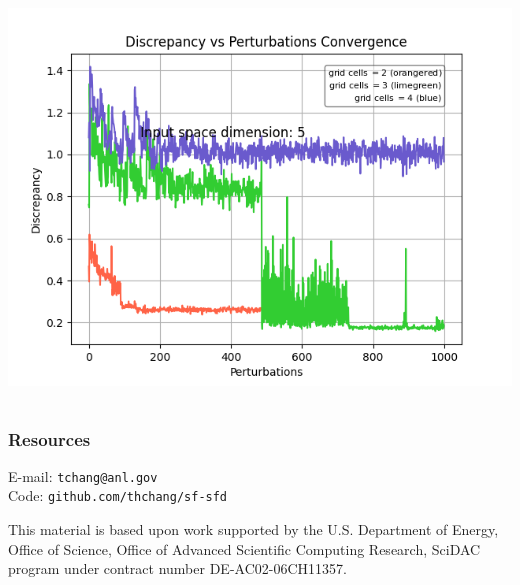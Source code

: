 \documentclass[aspectratio=169]{beamer}
\begin{document}
\begin{frame}
\begin{columns}
\begin{column}{0.3\textwidth}
\includegraphics[width=\textwidth]{5.png}\\
\end{column}
\end{columns}
\end{frame}

\begin{frame}\frametitle{Resources}
\begin{center}
{\large
E-mail: {\tt tchang@anl.gov}}\\
\bigskip
\bigskip
Code: {\tt github.com/thchang/sf-sfd}\\

\bigskip
\bigskip

{\small This material is based upon work supported by the U.S. Department of Energy, Office of Science, Office of Advanced Scientific Computing Research, SciDAC program under contract number DE-AC02-06CH11357.}
\end{center}
\end{frame}
\end{document}
